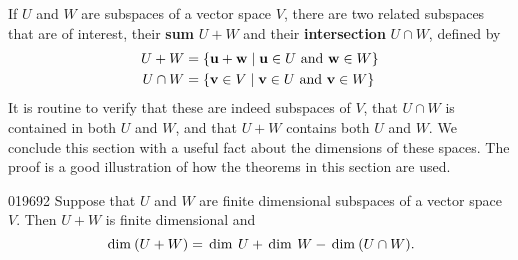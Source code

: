 If $U$ and $W$ are subspaces of a vector space $V$, there are two related subspaces that are of interest, their \textbf{sum} $U + W$ and their \textbf{intersection} $U \cap W$, defined by
\begin{align*}
U + W &= \{\textbf{u} + \textbf{w} \mid \textbf{u} \in U \mbox{ and } \textbf{w} \in W \} \\
U \cap W &= \{\textbf{v} \in V \mid \textbf{v} \in U \mbox{ and } \textbf{v} \in W \}
\end{align*}
It is routine to verify that these are indeed subspaces of $V$, that $U \cap W$ is contained in both $U$ and $W$, and that $U + W$ contains both $U$ and $W$. We conclude this section with a useful fact about the dimensions of these spaces. The proof is a good illustration of how the theorems in this section are used.

\begin{theorem}{}{019692}
Suppose that $U$ and $W$ are finite dimensional subspaces of a vector space $V$. Then $U + W$ is finite dimensional and
\begin{equation*}
\thinspace\operatorname{dim\medspace}(U + W) = \thinspace\operatorname{dim \medspace} U + \thinspace\operatorname{dim \medspace} W - \thinspace\operatorname{dim\medspace}(U \cap W).
\end{equation*}
\end{theorem}

